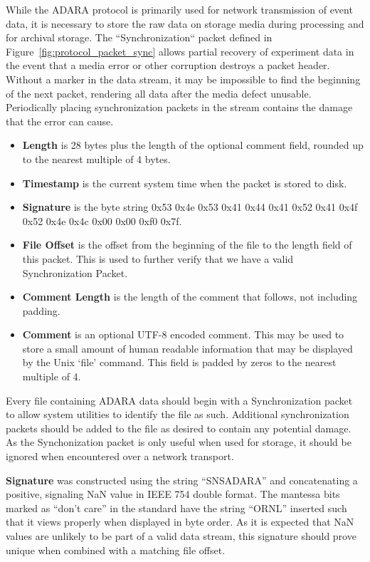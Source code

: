 While the ADARA protocol is primarily used for network transmission of
event data, it is necessary to store the raw data on storage media during
processing and for archival storage. The ``Synchronization`` packet defined
in Figure~\ref{fig:protocol_packet_sync} allows partial recovery of experiment
data in the event that a media error or other corruption destroys a packet
header. Without a marker in the data stream, it may be impossible to find
the beginning of the next packet, rendering all data after the media defect
unusable. Periodically placing synchronization packets in the stream contains
the damage that the error can cause.

\begin{itemize}
\item{\bf Length} is 28 bytes plus the length of the optional comment field,
rounded up to the nearest multiple of 4 bytes.
\item{\bf Timestamp} is the current system time when the packet is stored
to disk.
\item{\bf Signature} is the byte string 0x53 0x4e 0x53 0x41 0x44 0x41 0x52
0x41 0x4f 0x52 0x4e 0x4c 0x00 0x00 0xf0 0x7f.
\item{\bf File Offset} is the offset from the beginning of the file to the
length field of this packet. This is used to further verify that we have a
valid Synchronization Packet.
\item{\bf Comment Length} is the length of the comment that follows, not
including padding.
\item{\bf Comment} is an optional UTF-8 encoded comment. This may be used
to store a small amount of human readable information that may be displayed
by the Unix `file' command. This field is padded by zeros to the nearest
multiple of 4.
\end{itemize}

Every file containing ADARA data should begin with a Synchronization packet to
allow system utilities to identify the file as such. Additional synchronization
packets should be added to the file as desired to contain any potential damage.
As the Synchonization packet is only useful when used for storage, it should be
ignored when encountered over a network transport.

{\bf Signature} was constructed using the string ``SNSADARA'' and concatenating
a positive, signaling NaN value in IEEE 754 double format. The mantessa bits
marked as ``don't care'' in the standard have the string ``ORNL'' inserted such
that it views properly when displayed in byte order.  As it is expected that
NaN values are unlikely to be part of a valid data stream, this signature
should prove unique when combined with a matching file offset.


